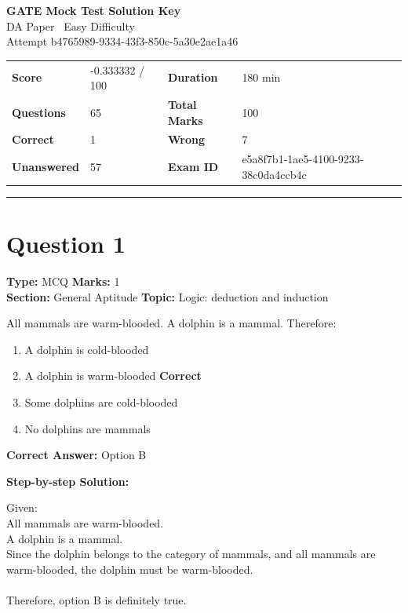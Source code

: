 \documentclass[11pt]{article}
\begin{document}
\begin{center}
  {\LARGE \textbf{\textcolor{gateblue}{GATE Mock Test Solution Key}}}\\[0.5em]
  {\large DA Paper \textbar\ Easy Difficulty}\\[0.4em]
  {\normalsize Attempt b4765989-9334-43f3-850c-5a30e2ae1a46}
\end{center}

\vspace{1em}

\begin{tabular}{>{\bfseries}p{} p{} >{\bfseries}p{} p{}}
Score & -0.333332 / 100 & Duration & 180 min \\
Questions & 65 & Total Marks & 100 \\
Correct & 1 & Wrong & 7 \\
Unanswered & 57 & Exam ID & e5a8f7b1-1ae5-4100-9233-38c0da4ccb4c \\
\end{tabular}

\vspace{1.25em}
\hrule
\vspace{1em}

\section*{Question 1}
\textbf{Type:} MCQ \hfill \textbf{Marks:} 1\\
\textbf{Section:} General Aptitude \hfill \textbf{Topic:} Logic: deduction and induction

All mammals are warm-blooded. A dolphin is a mammal. Therefore:


\begin{enumerate}[label=\textbf{\Alph*.}, leftmargin=1.8em]
\item A dolphin is cold-blooded\item A dolphin is warm-blooded \hfill {\color{gategreen}\textbf{Correct}}\item Some dolphins are cold-blooded\item No dolphins are mammals\end{enumerate}

\textbf{Correct Answer:} Option B

\textbf{Step-by-step Solution:}

Given:\\
 All mammals are warm-blooded.\\
 A dolphin is a mammal.\\
 Since the dolphin belongs to the category of mammals, and all mammals are warm-blooded, the dolphin must be warm-blooded.\\
\\
 Therefore, option B is definitely true.
\end{document}
